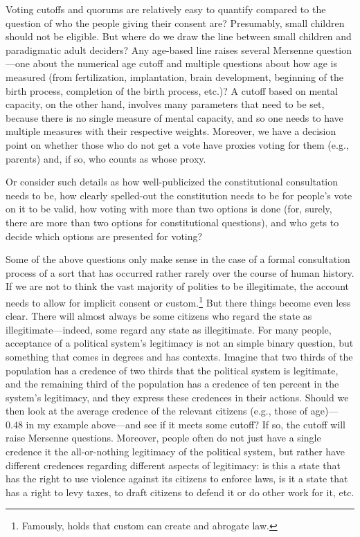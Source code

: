 Voting cutoffs and quorums are relatively easy to quantify compared to the question of who the people giving their consent are?
Presumably, small children should not be eligible. But where do we draw the line between small children and paradigmatic adult
deciders? Any age-based line raises several Mersenne question---one about the numerical age cutoff and multiple questions about 
how age is measured (from fertilization, implantation, brain development, beginning of the birth process, completion of the
birth process, etc.)? A cutoff based on mental capacity, on the other hand, involves many parameters that need to be set, because
there is no single measure of mental capacity, and so one needs to have multiple measures with their respective weights. Moreover,
we have a decision point on whether those who do not get a vote have proxies voting for them (e.g., parents) and, if so, who 
counts as whose proxy.

Or consider such details as how well-publicized the constitutional consultation needs to be, how clearly spelled-out the 
constitution needs to be for people's vote on it to be valid, how voting with more than two options is done (for, surely,
there are more than two options for constitutional questions), and who gets to decide which options are presented for
voting?

Some of the above questions only make sense in the case of a formal consultation process of a sort that has occurred rather
rarely over the course of human history. If we are not to think the vast majority of polities to be illegitimate, the account
needs to allow for implicit consent or custom.\footnote{Famously,
 holds that custom can create and abrogate law.} But there things become even less clear.
There will almost always be some citizens who regard the state as illegitimate---indeed, some regard any state 
as illegitimate. For many people, acceptance of a political system's legitimacy is not an simple binary question, but 
something that comes in degrees and has contexts. Imagine that two thirds of the population has a credence of two thirds
that the political system is legitimate, and the remaining third of the population has a credence of ten percent in 
the system's legitimacy, and they express these credences in their actions. Should we then look at the average credence
of the relevant citizens (e.g., those of age)---$0.48$ in my example above---and see if it meets some cutoff? If so, the
cutoff will raise Mersenne questions. Moreover, people often do not just have a single credence it the all-or-nothing 
legitimacy of the political system, but rather have different credences regarding different aspects of legitimacy: is this
a state that has the right to use violence against its citizens to enforce laws, is it a state that has a right to levy taxes,
to draft citizens to defend it or do other work for it, etc.

